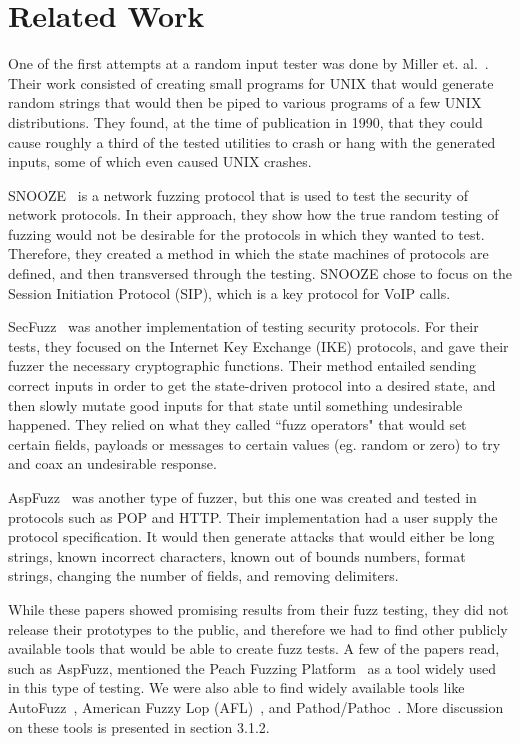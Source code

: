 \documentclass[letterpaper,twocolumn,10pt]{article}
\begin{document}
\section{Related Work} 

One of the first attempts at a random input tester was done by Miller et. al.~\cite{millerUNIX}. Their work consisted of creating small programs for UNIX that would generate random strings that would then be piped to various programs of a few UNIX distributions. They found, at the time of publication in 1990, that they could cause roughly a third of the tested utilities to crash or hang with the generated inputs, some of which even caused UNIX crashes.

SNOOZE~\cite{snooze} is a network fuzzing protocol that is used to test the security of network protocols. In their approach, they show how the true random testing of fuzzing would not be desirable for the protocols in which they wanted to test. Therefore, they created a method in which the state machines of protocols are defined, and then transversed through the testing. SNOOZE chose to focus on the Session Initiation Protocol (SIP), which is a key protocol for VoIP calls.

SecFuzz~\cite{secfuzz} was another implementation of testing security protocols. For their tests, they focused on the Internet Key Exchange (IKE) protocols, and gave their fuzzer the necessary cryptographic functions. Their method entailed sending correct inputs in order to get the state-driven protocol into a desired state, and then slowly mutate good inputs for that state until something undesirable happened. They relied on what they called ``fuzz operators" that would set certain fields, payloads or messages to certain values (eg. random or zero) to try and coax an undesirable response.

AspFuzz~\cite{aspfuzz} was another type of fuzzer, but this one was created and tested in protocols such as POP and HTTP. Their implementation had a user supply the protocol specification. It would then generate attacks that would either be long strings, known incorrect characters, known out of bounds numbers, format strings, changing the number of fields, and removing delimiters. 

While these papers showed promising results from their fuzz testing, they did not release their prototypes to the public, and therefore we had to find other publicly available tools that would be able to create fuzz tests. A few of the papers read, such as AspFuzz, mentioned the Peach Fuzzing Platform~\cite{peach} as a tool widely used in this type of testing. We were also able to find widely available tools like AutoFuzz~\cite{autofuzz}, American Fuzzy Lop (AFL)~\cite{afl}, and Pathod/Pathoc~\cite{pathod}. More discussion on these tools is presented in section 3.1.2.
\end{document}
